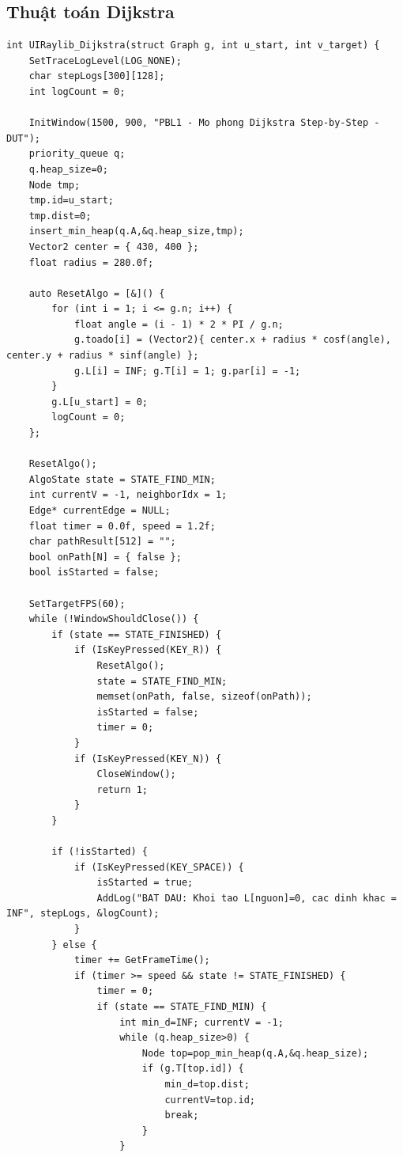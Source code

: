 \documentclass[12pt,a4paper,oneside]{report}
\begin{document}
\subsection*{Thuật toán Dijkstra}
\begin{lstlisting}[style=UserCStyle]
int UIRaylib_Dijkstra(struct Graph g, int u_start, int v_target) {
    SetTraceLogLevel(LOG_NONE);
    char stepLogs[300][128];
    int logCount = 0;

    InitWindow(1500, 900, "PBL1 - Mo phong Dijkstra Step-by-Step - DUT");
    priority_queue q;
    q.heap_size=0;
    Node tmp;
    tmp.id=u_start;
    tmp.dist=0;
    insert_min_heap(q.A,&q.heap_size,tmp);
    Vector2 center = { 430, 400 }; 
    float radius = 280.0f;
    
    auto ResetAlgo = [&]() {
        for (int i = 1; i <= g.n; i++) {
            float angle = (i - 1) * 2 * PI / g.n;
            g.toado[i] = (Vector2){ center.x + radius * cosf(angle), center.y + radius * sinf(angle) };
            g.L[i] = INF; g.T[i] = 1; g.par[i] = -1;
        }
        g.L[u_start] = 0;
        logCount = 0;
    };
    
    ResetAlgo();
    AlgoState state = STATE_FIND_MIN;
    int currentV = -1, neighborIdx = 1;
    Edge* currentEdge = NULL;
    float timer = 0.0f, speed = 1.2f; 
    char pathResult[512] = "";
    bool onPath[N] = { false };
    bool isStarted = false;

    SetTargetFPS(60);
    while (!WindowShouldClose()) {        
        if (state == STATE_FINISHED) {
            if (IsKeyPressed(KEY_R)) { 
                ResetAlgo();
                state = STATE_FIND_MIN;
                memset(onPath, false, sizeof(onPath));
                isStarted = false;
                timer = 0;
            }
            if (IsKeyPressed(KEY_N)) { 
                CloseWindow();
                return 1; 
            }
        }

        if (!isStarted) {
            if (IsKeyPressed(KEY_SPACE)) {
                isStarted = true;
                AddLog("BAT DAU: Khoi tao L[nguon]=0, cac dinh khac = INF", stepLogs, &logCount);
            }
        } else {
            timer += GetFrameTime();
            if (timer >= speed && state != STATE_FINISHED) {
                timer = 0;
                if (state == STATE_FIND_MIN) {
                    int min_d=INF; currentV = -1;
                    while (q.heap_size>0) {
                        Node top=pop_min_heap(q.A,&q.heap_size);
                        if (g.T[top.id]) {
                            min_d=top.dist;
                            currentV=top.id;
                            break;
                        }
                    }
                    

\end{lstlisting}
\end{document}
